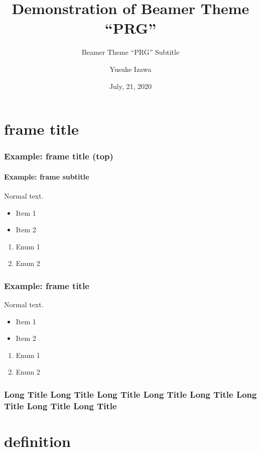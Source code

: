 \documentclass[12pt,aspectratio=169]{beamer}
\title{Demonstration of Beamer Theme ``PRG''}
\subtitle{Beamer Theme ``PRG'' Subtitle}
\author{Yusuke Izawa}
\date{July, 21, 2020}
\begin{document}
\frame{\maketitle}

\section{frame title}

\begin{frame}[fragile,t]
  \frametitle{Example: frame title (top)}
  \framesubtitle{Example: frame subtitle}

  Normal text.

  \begin{itemize}
  \item Item 1
  \item Item 2
  \end{itemize}

  \begin{enumerate}
  \item Enum 1
  \item Enum 2
  \end{enumerate}

\end{frame}

\begin{frame}[fragile,t]
  \frametitle{Example: frame title}

  Normal text.

  \begin{itemize}
  \item Item 1
  \item Item 2
  \end{itemize}

  \begin{enumerate}
  \item Enum 1
  \item Enum 2
  \end{enumerate}

\end{frame}

\begin{frame}
  \frametitle{Long Title Long Title Long Title Long Title Long Title Long Title Long Title Long Title}

\end{frame}



\section{definition}
\end{document}
